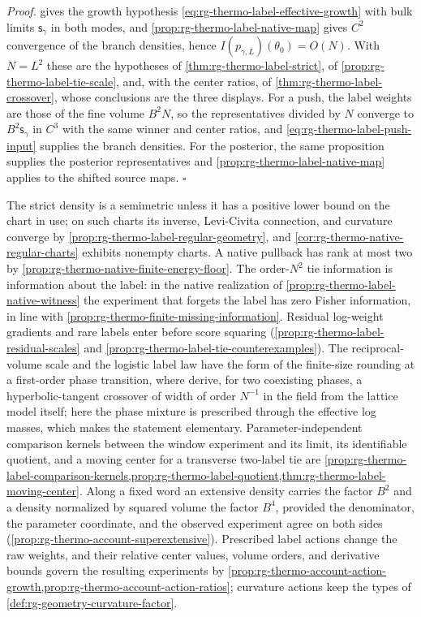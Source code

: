 \noindent\emph{Proof.}
 gives the growth hypothesis
\cref{eq:rg-thermo-label-effective-growth} with bulk limits $\mathsf s_\gamma$
in both modes, and \cref{prop:rg-thermo-label-native-map} gives $C^2$
convergence of the branch densities, hence
$I(p_{\gamma,L})(\theta_0)=O(N)$. With $N=L^2$ these are the hypotheses of
\cref{thm:rg-thermo-label-strict}, of \cref{prop:rg-thermo-label-tie-scale},
and, with the center ratios, of \cref{thm:rg-thermo-label-crossover}, whose
conclusions are the three displays. For a push, the label weights are those
of the fine volume $B^2N$, so the representatives divided by $N$ converge to
$B^2\mathsf s_\gamma$ in $C^3$ with the same winner and center ratios, and
\cref{eq:rg-thermo-label-push-input} supplies the branch densities. For the
posterior, the same proposition supplies the posterior representatives and
\cref{prop:rg-thermo-label-native-map} applies to the shifted source maps.
$\square$

The strict density is a semimetric unless it has a positive lower bound on
the chart in use; on such charts its inverse, Levi-Civita connection, and
curvature converge by \cref{prop:rg-thermo-label-regular-geometry}, and
\cref{cor:rg-thermo-native-regular-charts} exhibits nonempty charts. A native
pullback has rank at most two by
\cref{prop:rg-thermo-native-finite-energy-floor}. The order-$N^2$ tie
information is information about the label: in the native realization of
\cref{prop:rg-thermo-label-native-witness} the experiment that forgets the
label has zero Fisher information, in line with
\cref{prop:rg-thermo-finite-missing-information}. Residual log-weight
gradients and rare labels enter before score squaring
(\cref{prop:rg-thermo-label-residual-scales} and
\cref{prop:rg-thermo-label-tie-counterexamples}). The reciprocal-volume scale
and the logistic label law have the form of the finite-size rounding at a
first-order phase transition, where
\citet[Thm.~3.2]{BorgsKotecky1990} derive, for two coexisting phases, a
hyperbolic-tangent crossover of width of order $N^{-1}$ in the field from the
lattice model itself; here the phase mixture is
prescribed through the effective log masses, which makes the statement
elementary. Parameter-independent comparison kernels between the window
experiment and its limit, its identifiable quotient, and a moving center for
a transverse two-label tie are
\cref{prop:rg-thermo-label-comparison-kernels,prop:rg-thermo-label-quotient,thm:rg-thermo-label-moving-center}.
Along a fixed word an extensive density carries the factor $B^2$ and a
density normalized by squared volume the factor $B^4$, provided the
denominator, the parameter coordinate, and the observed experiment agree on
both sides (\cref{prop:rg-thermo-account-superextensive}). Prescribed label
actions change the raw weights, and their relative center values, volume
orders, and derivative bounds govern the resulting experiments by
\cref{prop:rg-thermo-account-action-growth,prop:rg-thermo-account-action-ratios};
curvature actions keep the types of \cref{def:rg-geometry-curvature-factor}.

